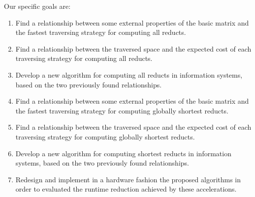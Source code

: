 \documentclass[authoryear,11pt]{elsarticle}
\begin{document}
  Our specific goals are:
  \begin{enumerate}
  \item Find a relationship between some external properties of the basic matrix and the fastest 
  		traversing strategy for computing all reducts.
  		  	
  		
  \item Find a relationship between the traversed space and the expected cost of each traversing strategy
  		for computing all reducts.
  
  \item Develop a new algorithm for computing all reducts in information systems, based 
  		on the two previously found relationships.
  		
  \item Find a relationship between some external properties of the basic matrix and the fastest 
  		traversing strategy for computing globally shortest reducts.
  		  	
  		
  \item Find a relationship between the traversed space and the expected cost of each traversing strategy
  		for computing globally shortest reducts.
  
  \item Develop a new algorithm for computing shortest reducts in information systems, based 
  		on the two previously found relationships.
  
  \item Redesign and implement in a hardware fashion the proposed algorithms in order to evaluated the
  		runtime reduction achieved by these accelerations.  		
  \end{enumerate}
\end{document}
